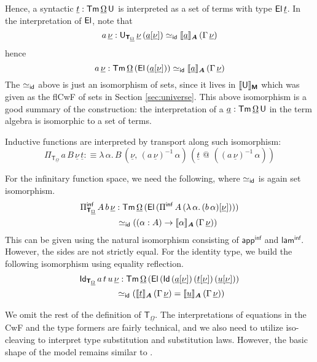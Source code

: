 \documentclass[sigplan,review,anonymous]{acmart}\settopmatter{printfolios=true,printccs=false,printacmref=false}
\makeatletter
\newcommand{\Pii}{\Pi}
\newcommand{\Piinf}{\Pi^{\mathsf{inf}}}
\newcommand{\appinf}{\mathsf{app^{inf}}}
\newcommand{\laminf}{\mathsf{lam^{inf}}}
\newcommand{\appitt}{\mathop{{\scriptstyle @}}}
\newcommand{\bA}{\boldsymbol{A}}
\newcommand{\bM}{\boldsymbol{\mathsf{M}}}
\newcommand{\bT}{\boldsymbol{\mathsf{T}}}
\newcommand{\ul}[1]{\underline{#1}}
\newcommand{\ulOmega}{\ul{\Omega}}
\newcommand{\ulnu}{\ul{\nu}}
\newcommand{\ult}{\ul{t}}
\newcommand{\ulu}{\ul{u}}
\newcommand{\ula}{\ul{a}}
\newcommand{\llb}{\llbracket}
\newcommand{\rrb}{\rrbracket}
\makeatother
\begin{document}
\begin{definition}
Hence, a syntactic $\ult : \Tm\,\ulOmega\,\U$ is interpreted as a set of terms
with type $\El\,\ult$. In the interpretation of $\mathsf{El}$, note that
\[
  a\,\ulnu : \U_{\bT_{\ulOmega}}\,\ulnu\,(\ula[\ulnu]) \simeq_{\id}
                 \llb\ula\rrb_{\bA}\,(\Gamma\,\ulnu)
\]
hence
\[
a\,\ulnu : \Tm\,\ulOmega\,(\El\,(\ula[\ulnu])) \simeq_{\id}
           \llb\ula\rrb_{\bA}\,(\Gamma\,\ulnu)
\]
The $\simeq_{\mathsf{id}}$ above is just an isomorphism of sets, since it lives in
$\llb\U\rrb_{\bM}$ which was given as the flCwF of sets in Section
\ref{sec:universe}. This above isomorphism is a good summary of the
construction: the interpretation of a $\ula : \Tm\,\ulOmega\,\U$ in the term
algebra is isomorphic to a set of terms.

Inductive functions are interpreted by transport along such isomorphism:
\[
  \Pii_{\bT_{\ulOmega}}\,a\,B\,\ulnu\,\ult :\equiv \lambda\,\alpha.\,
         B\,(\ulnu,\,(a\,\ulnu)^{-1}\,\alpha)\,(\ult\,\appitt\,((a\,\ulnu)^{-1}\,\alpha))
\]

For the infinitary function space, we need the following, where $\simeq_{\mathsf{id}}$ is
again set isomorphism.
\begin{alignat*}{3}
  & \Piinf_{\bT_{\ulOmega}}\,A\,b\,\ulnu : \Tm\,\ulOmega\,(\El\,(\Piinf\,A\,(\lambda\,\alpha.\,(b\,\alpha)[\ulnu])))\\
  & \hspace{4.2em}\simeq_{\id} ((\alpha : A) \ra \llb\alpha\rrb_{\bA}\,(\Gamma\,\ulnu))
\end{alignat*}
This can be given using the natural isomorphism consisting of $\appinf$ and
$\laminf$. However, the sides are not strictly equal. For the identity type, we
build the following isomorphism using equality reflection.
\begin{alignat*}{3}
  & \Id_{\bT_{\ulOmega}}\,a\,t\,u\,\ulnu : \Tm\,\ulOmega\,(\El\,(\Id\,(\ula[\ulnu])\,(\ult[\ulnu])\,(\ulu[\ulnu]))\\
  & \hspace{4.2em}\simeq_{\id} (\llb\ult\rrb_{\bA}\,(\Gamma\,\ulnu) =   \llb\ulu\rrb_{\bA}\,(\Gamma\,\ulnu))
\end{alignat*}

We omit the rest of the definition of $\bT_{\ulOmega}$. The interpretations of
equations in the CwF and the type formers are fairly technical, and we also
need to utilize iso-cleaving to interpret type substitution and substitution
laws. However, the basic shape of the model remains similar to
\cite{kaposi2019constructing}.
\end{definition}
\end{document}
